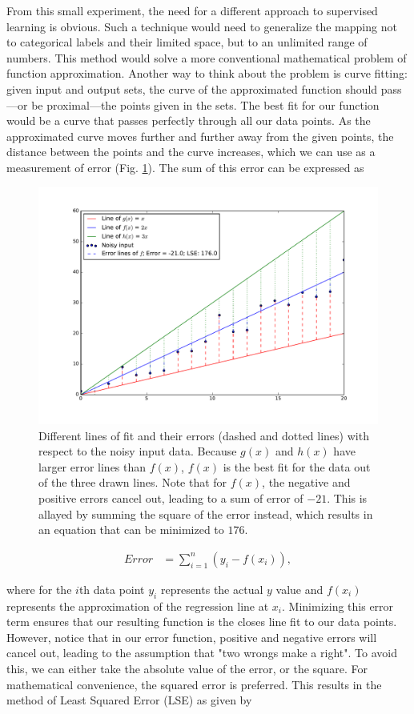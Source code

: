 From this small experiment, the need for a different approach to supervised learning is obvious. Such a technique would need to generalize the mapping not to categorical labels and their limited space, but to an unlimited range of numbers. This method would solve a more conventional mathematical problem of function approximation. Another way to think about the problem is curve fitting: given input and output sets, the curve of the approximated function should pass---or be proximal---the points given in the sets. The best fit for our function would be a curve that passes perfectly through all our data points. As the approximated curve moves further and further away from the given points, the distance between the points and the curve increases, which we can use as a measurement of error (Fig. \ref{fig:error_lines}). The sum of this error can be expressed as

\begin{figure}[!h]
  \centering
  \includegraphics[width=0.7\linewidth]{figures/error_lines.pdf}
  \caption{Different lines of fit and their errors (dashed and dotted lines) with respect to the noisy input data. Because $g(x)$ and $h(x)$ have larger error lines than $f(x)$, $f(x)$ is the best fit for the data out of the three drawn lines. Note that for $f(x)$, the negative and positive errors cancel out, leading to a sum of error of $-21$. This is allayed by summing the square of the error instead, which results in an equation that can be minimized to $176$.}
  \label{fig:error_lines}
\end{figure}

\begin{align*}
  Error &= \sum_{i=1}^n (y_i-f(x_i)),
\end{align*}

where for the $i$th data point $y_i$ represents the actual $y$ value and $f(x_i)$ represents the approximation of the regression line at $x_i$. Minimizing this error term ensures that our resulting function is the closes line fit to our data points. However, notice that in our error function, positive and negative errors will cancel out, leading to the assumption that "two wrongs make a right". To avoid this, we can either take the absolute value of the error, or the square. For mathematical convenience, the squared error is preferred. This results in the method of Least Squared Error (LSE) as given by

